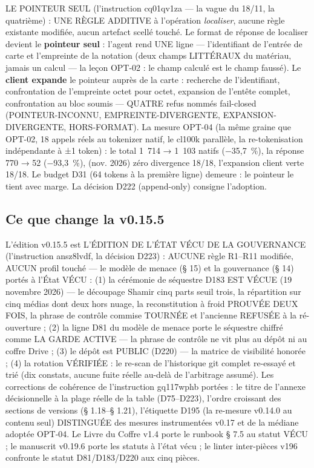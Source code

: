 LE POINTEUR SEUL (l'instruction cq01qv1za — la vague du 18/11, la
quatrième) : UNE RÈGLE ADDITIVE à l'opération \emph{localiser}, aucune
règle existante modifiée, aucun artefact scellé touché. Le format de
réponse de localiser devient le \textbf{pointeur seul} : l'agent rend
UNE ligne — l'identifiant de l'entrée de carte et l'empreinte
 de la notation (deux champs LITTÉRAUX du matériau,
jamais un calcul — la leçon OPT-02 : le champ calculé est le champ
faussé). Le \textbf{client expande} le pointeur auprès de la carte :
recherche de l'identifiant, confrontation de l'empreinte octet pour
octet, expansion de l'entête complet, confrontation au bloc soumis —
QUATRE refus nommés fail-closed (POINTEUR-INCONNU,
EMPREINTE-DIVERGENTE, EXPANSION-DIVERGENTE, HORS-FORMAT). La mesure
OPT-04 (la même graine que OPT-02, 18 appels réels au tokenizer natif,
le cl100k parallèle, la re-tokenisation indépendante à ±1 token) : le
total 1~714 → 1~103 natifs (−35,7~\%), la réponse 770 → 52
(−93,3~\%), (nov. 2026) zéro divergence 18/18, l'expansion client
verte 18/18. Le
budget D31 (64 tokens à la première ligne) demeure : le pointeur le
tient avec marge. La décision D222 (append-only) consigne l'adoption.



\subsection{Ce que change la v0.15.5}\label{sec:nouveautes155}

L'édition v0.15.5 est L'ÉDITION DE L'ÉTAT VÉCU DE LA GOUVERNANCE
(l'instruction ansz8lvdf, la décision D223) : AUCUNE règle R1--R11
modifiée, AUCUN profil touché — le modèle de menace (§ 15) et la
gouvernance (§ 14) portés à l'État VÉCU : (1) la cérémonie de séquestre
D183 EST VÉCUE (19 novembre 2026) — le découpage Shamir cinq parts
seuil trois, la répartition sur cinq médias dont deux hors nuage, la
reconstitution à froid PROUVÉE DEUX FOIS, la phrase de contrôle commise
TOURNÉE et l'ancienne REFUSÉE à la ré-ouverture ; (2) la ligne D81 du
modèle de menace porte le séquestre chiffré comme LA GARDE ACTIVE — la
phrase de contrôle ne vit plus au dépôt ni au coffre Drive ; (3) le
dépôt est PUBLIC (D220) — la matrice de visibilité honorée ; (4) la
rotation VÉRIFIÉE : le re-scan de l'historique git complet re-essayé et
trié (dix constats, aucune fuite réelle au-delà de l'arbitrage assumé).
Les corrections de cohérence de l'instruction gq117wphb portées : le
titre de l'annexe décisionnelle à la plage réelle de la table
(D75--D223), l'ordre croissant des sections de versions (§ 1.18--§ 1.21),
l'étiquette D195 (la re-mesure v0.14.0 au contenu seul) DISTINGUÉE des
mesures instrumentées v0.17 et de la médiane adoptée OPT-04. Le Livre
du Coffre v1.4 porte le runbook § 7.5 au statut VÉCU ; le manuscrit
v0.19.6 porte les statuts à l'état vécu ; le linter inter-pièces v196
confronte le statut D81/D183/D220 aux cinq pièces.

